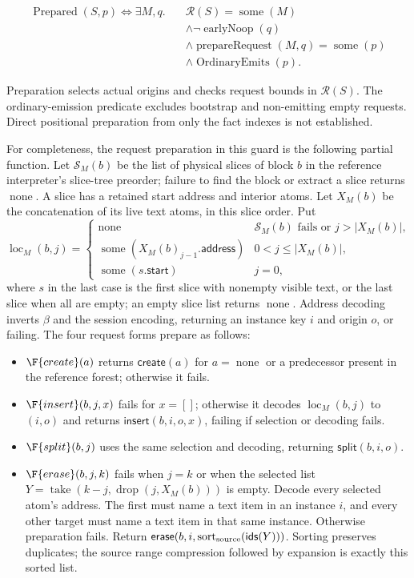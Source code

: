 \[
\begin{aligned}
\operatorname{Prepared}(S,p)\iff\exists M,q.\quad
&\mathcal R(S)=\operatorname{some}(M)\\
&\land\neg\operatorname{earlyNoop}(q)\\
&\land\operatorname{prepareRequest}(M,q)=\operatorname{some}(p)\\
&\land\operatorname{OrdinaryEmits}(p).
\end{aligned}
\]

Preparation selects actual origins and checks request bounds in $\mathcal R(S)$.
The ordinary-emission predicate excludes bootstrap and non-emitting empty
requests. Direct positional preparation from only the fact indexes is not
established.

For completeness, the request preparation in this guard is the following
partial function. Let $\mathcal S_M(b)$ be the list of physical slices of
block $b$ in the reference interpreter's slice-tree preorder; failure to
find the block or extract a slice returns $\operatorname{none}$. A slice has a
retained start address and interior atoms. Let $X_M(b)$ be the concatenation
of its live text atoms, in this slice order. Put
\[
\operatorname{loc}_M(b,j)=
\begin{cases}
\operatorname{none}&\mathcal S_M(b)\text{ fails or }j>|X_M(b)|,\\
\operatorname{some}(X_M(b)_{j-1}.\mathsf{address})&0<j\le |X_M(b)|,\\
\operatorname{some}(s.\mathsf{start})&j=0,
\end{cases}
\]
where $s$ in the last case is the first slice with nonempty visible text,
or the last slice when all are empty; an empty slice list returns
$\operatorname{none}$. Address decoding inverts $\beta$ and the session encoding,
returning an instance key $i$ and origin $o$, or failing. The four
request forms prepare as follows:
\begin{itemize}
\item $\F{create}(a)$ returns $\mathsf{create}(a)$ for $a=\operatorname{none}$
  or a predecessor present in the reference forest; otherwise it fails.
\item $\F{insert}(b,j,x)$ fails for $x=[]$; otherwise it decodes
  $\operatorname{loc}_M(b,j)$ to $(i,o)$ and returns
  $\mathsf{insert}(b,i,o,x)$, failing if selection or decoding fails.
\item $\F{split}(b,j)$ uses the same selection and decoding, returning
  $\mathsf{split}(b,i,o)$.
\item $\F{erase}(b,j,k)$ fails when $j=k$ or when the selected list
  $Y=\operatorname{take}(k-j,\operatorname{drop}(j,X_M(b)))$ is empty.
  Decode every selected atom's address. The first must name a text item
  in an instance $i$, and every other target must name a text item in
  that same instance. Otherwise preparation fails. Return
  $\mathsf{erase}(b,i,\operatorname{sort}_{\rm source}(\mathsf{ids}(Y)))$.
  Sorting preserves duplicates; the source range compression followed
  by expansion is exactly this sorted list.
\end{itemize}
